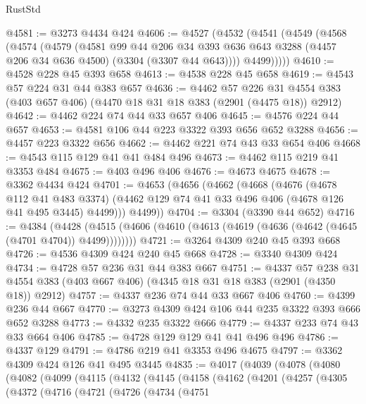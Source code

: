 \begin{lexlean}{RustStd}
\begin{coremodule}
@4581 := @3273 @4434 @424
@4606 := @4527
    (@4532
      (@4541
        (@4549
          (@4568
            (@4574
              (@4579
                (@4581
                  @99
                  @44
                  @206
                  @34
                  @393
                  @636
                  @643
                  @3288
                  (@4457 @206 @34 @636 @4500)
                  (@3304 (@3307 @44 @643))))
              @4499)))))
@4610 := @4528 @228 @45 @393 @658
@4613 := @4538 @228 @45 @658
@4619 := @4543 @57 @224 @31 @44 @383 @657
@4636 := @4462
    @57
    @226
    @31
    @4554
    @383
    (@403 @657 @406)
    (@4470 @18 @31 @18 @383 (@2901 (@4475 @18)) @2912)
@4642 := @4462 @224 @74 @44 @33 @657 @406
@4645 := @4576 @224 @44 @657
@4653 := @4581 @106 @44 @223 @3322 @393 @656 @652 @3288
@4656 := @4457 @223 @3322 @656
@4662 := @4462 @221 @74 @43 @33 @654 @406
@4668 := @4543 @115 @129 @41 @41 @484 @496
@4673 := @4462 @115 @219 @41 @3353 @484
@4675 := @403 @496 @406
@4676 := @4673 @4675
@4678 := @3362 @4434 @424
@4701 := @4653
    (@4656
      (@4662
        (@4668
          (@4676
            (@4678 @112 @41 @483 @3374)
            (@4462 @129 @74 @41 @33 @496 @406 (@4678 @126 @41 @495 @3445) @4499)))
        @4499))
@4704 := @3304 (@3390 @44 @652)
@4716 := @4384
    (@4428 (@4515 (@4606 (@4610 (@4613 (@4619 (@4636 (@4642 (@4645 (@4701 @4704)) @4499))))))))
@4721 := @3264 @4309 @240 @45 @393 @668
@4726 := @4536 @4309 @424 @240 @45 @668
@4728 := @3340 @4309 @424
@4734 := @4728 @57 @236 @31 @44 @383 @667
@4751 := @4337
    @57
    @238
    @31
    @4554
    @383
    (@403 @667 @406)
    (@4345 @18 @31 @18 @383 (@2901 (@4350 @18)) @2912)
@4757 := @4337 @236 @74 @44 @33 @667 @406
@4760 := @4399 @236 @44 @667
@4770 := @3273 @4309 @424 @106 @44 @235 @3322 @393 @666 @652 @3288
@4773 := @4332 @235 @3322 @666
@4779 := @4337 @233 @74 @43 @33 @664 @406
@4785 := @4728 @129 @129 @41 @41 @496 @496
@4786 := @4337 @129
@4791 := @4786 @219 @41 @3353 @496 @4675
@4797 := @3362 @4309 @424 @126 @41 @495 @3445
@4835 := @4017
    (@4039
      (@4078
        (@4080
          (@4082
            (@4099
              (@4115
                (@4132
                  (@4145
                    (@4158
                      (@4162
                        (@4201
                          (@4257
                            (@4305
                              (@4372
                                (@4716
                                  (@4721
                                    (@4726
                                      (@4734
                                        (@4751

\end{coremodule}
\end{lexlean}
